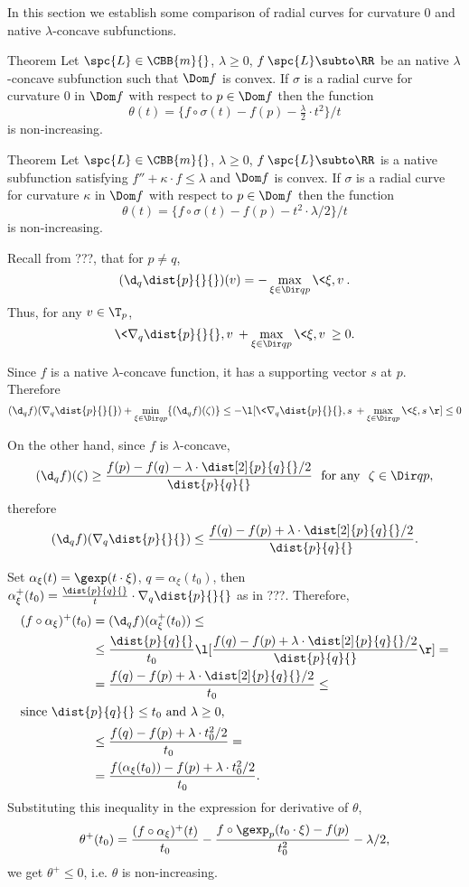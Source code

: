 In this section we establish some comparison of radial curves for curvature $0$ and native $\lambda$-concave subfunctions.

\begin{thm}{Theorem} \label{thm:rad+conc}
Let $\spc{L}\in \CBB{m}{}$, 
$\lambda\ge 0$, 
$f\:\spc{L}\subto\RR$ be an native $\lambda$-concave subfunction such that $\Dom f$ is convex.
If $\sigma$ is  a  radial curve for curvature $0$ in $\Dom f$ with respect to $p\in\Dom f$ then the function
\[\theta(t)=\{f\circ\sigma(t)-f(p)-\tfrac{\lambda}{2}\cdot t^2\}/t\]
is non-increasing.
\end{thm}

\begin{thm}{Theorem} 
Let $\spc{L}\in \CBB{m}{}$, 
$\lambda\ge 0$, 
$f\:\spc{L}\subto\RR$ is a native subfunction satisfying $f''+\kappa\cdot  f\le \lambda$ 
and $\Dom f$ is convex. 
If $\sigma$ is  a radial curve for curvature $\kappa$ in $\Dom f$ with respect to $p\in\Dom f$ then the function
\[\theta(t)=\{f\circ\sigma(t)-f(p)-t^2\cdot\lambda/2\}/t\]
is non-increasing.
\end{thm}

Recall from ???, that for $p\not=q$, 
\[(\d_q\dist{p}{}{})(v)=-\max_{\xi\in\Dir qp}\<\xi,v\>.\]
Thus, for any $v\in\T_p$,
\[\<\nabla_q\dist{p}{}{},v\>+\max_{\xi\in\Dir qp}\<\xi,v\>\ge 0.\]

Since $f$ is a native $\lambda$-concave function,
it has a supporting vector $s$ at $p$.
Therefore
\[(\d_q f)(\nabla_q\dist{p}{}{})+\min_{\xi\in\Dir qp}\{(\d_q f)(\zeta)\}
\le
-\l[\<\nabla_q\dist{p}{}{},s\>+\max_{\xi\in\Dir qp}\<\xi,s\>\r]\le0\]

On the other hand, since $f$ is $\lambda$-concave,
\[(\d_q f)(\zeta)\ge \frac{f(p)-f(q)-\lambda\cdot\dist[2]{p}{q}{}/2}{\dist{p}{q}{}}\ \ \text{for any}\
\ \zeta\in \Dir qp,\]
therefore
\[(\d_q f)(\nabla_q\dist{p}{}{})
\le
\frac{f(q)-f(p)+\lambda\cdot\dist[2]{p}{q}{}/2}{\dist{p}{q}{}}.\]

Set $\alpha_\xi(t)=\gexp(t\cdot\xi)$, $q=\alpha_\xi(t_0)$, then 
$\alpha^+_\xi(t_0)
=
\tfrac{\dist{p}{q}{}}{t}\cdot\nabla_{q}\dist{p}{}{}$ as in ???. 
Therefore,
\begin{align*}
(f\circ\alpha_\xi)^+(t_0)
&=
(\d_q f)(\alpha^+_\xi(t_0))
\le
\\
&\le
\frac{\dist{p}{q}{}}{t_0}\l[\frac{f(q)-f(p)+\lambda\cdot\dist[2]{p}{q}{}/2}{\dist{p}{q}{}}\r]
=
\\
&=
\frac{f(q)-f(p)+\lambda\cdot\dist[2]{p}{q}{}/2}{t_0}
\le
\\
\intertext{since $\dist{p}{q}{}\le t_0$ and $\lambda\ge 0$,}
&\le \frac{f(q)-f(p)+\lambda\cdot t^2_0/2}{t_0}
=
\\
&=\frac{f(\alpha_\xi(t_0))-f(p)+\lambda\cdot t^2_0/2}{t_0}.
\end{align*}
Substituting this inequality in the expression for derivative of $\theta$,
\[\theta^+(t_0)=\frac{(f\circ\alpha_\xi)^+(t)}{t_0}
-\frac{f\circ\gexp_p(t_0\cdot\xi)- f(p)}{t_0^2}-\lambda /2,\] we get
$\theta^+\le 0$, i.e. $\theta$ is non-increasing. 

